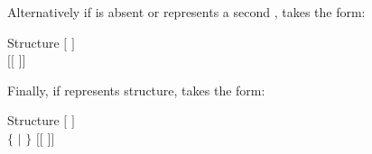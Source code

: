 \noindent
Alternatively if  is absent or represents a second ,
 takes the form:

\begin{DataStructure}{Structure }
$[$   $]$ \\
 $[[$  $]]$ 
\end{DataStructure}

\noindent
Finally, if  represents  structure,  takes
the form:

\begin{DataStructure}{Structure }
$[$   $]$ \\
 $\{$  $|$  $\}$
$[[$  $]]$ 
\end{DataStructure}

